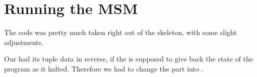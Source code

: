 \section{Running the MSM}
The  code was pretty much taken right out of the skeleton, with
some slight adjustments.

Our  had its tuple data in reverse, if the
 is supposed to give back the state of the program as it halted.
Therefore we had to change the  part into .
